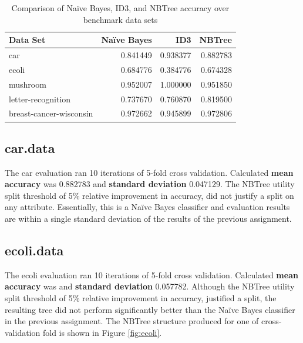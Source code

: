 \documentclass[10pt]{report}
\begin{document}
\begin{table}[h]
  \centering
  \begin{tabular}{ |l|r|r|r|} 
    \hline
    \textbf{Data Set} & \textbf{Na\"{i}ve Bayes} & \textbf{ID3} & \textbf{NBTree} \\ \hline
    car                      &  0.841449  &  0.938377  & 0.882783 \\ \hline
    ecoli                    &  0.684776  &  0.384776  & 0.674328 \\ \hline
    mushroom                 &  0.952007  &  1.000000  & 0.951850 \\ \hline
    letter-recognition       &  0.737670  &  0.760870  & 0.819500 \\ \hline
    breast-cancer-wisconsin  &  0.972662  &  0.945899  & 0.972806 \\ \hline
  \end{tabular}
  \caption{Comparison of Na\"{i}ve Bayes, ID3, and
    NBTree accuracy over benchmark data sets}
  \label{tab:comparison}
\end{table}


\subsection*{car.data}
The car evaluation ran 10 iterations of 5-fold cross
validation. Calculated \textbf{mean accuracy} was 0.882783 and
\textbf{standard deviation} 0.047129. The NBTree utility split
threshold of 5\% relative improvement in accuracy, did not justify a
split on any attribute. Essentially, this is a Na\"{i}ve Bayes
classifier and evaluation results are within a single standard
deviation of the results of the previous assignment.


\subsection*{ecoli.data}
The ecoli evaluation ran 10 iterations of 5-fold cross
validation. Calculated \textbf{mean accuracy} was  and
\textbf{standard deviation} 0.057782. Although the NBTree utility split
threshold of 5\% relative improvement in accuracy, justified a split,
the resulting tree did not perform significantly better than the
Na\"{i}ve Bayes classifier in the previous assignment. The NBTree
structure produced for one of cross-validation fold is shown in Figure
\ref{fig:ecoli}. 
\end{document}
